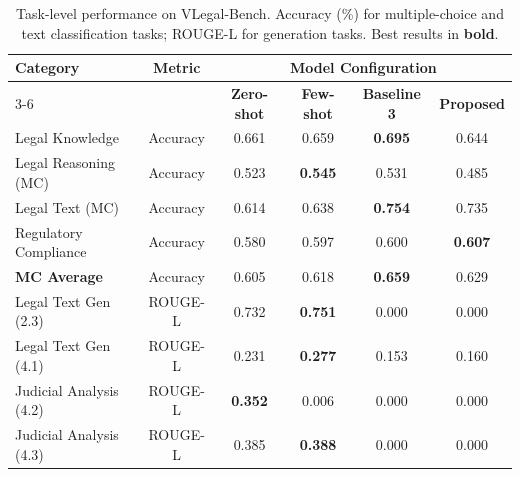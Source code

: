 \documentclass[11pt,a4paper]{article}
\newcommand{\system}{VLegal-Bench}
\newcommand{\rougel}{ROUGE-L}
\begin{document}
\begin{table}[htbp]
\centering
\caption{Task-level performance on \system{}. Accuracy (\%) for multiple-choice and text classification tasks; \rougel{} for generation tasks. Best results in \textbf{bold}.}
\label{tab:main_results}
\begin{tabular}{@{}lccccc@{}}
\toprule
\multirow{2}{*}{\textbf{Category}} & \multirow{2}{*}{\textbf{Metric}} & \multicolumn{4}{c}{\textbf{Model Configuration}} \\
\cmidrule(lr){3-6}
 & & \textbf{Zero-shot} & \textbf{Few-shot} & \textbf{Baseline 3} & \textbf{Proposed} \\
\midrule
Legal Knowledge       & Accuracy & 0.661 & 0.659 & \textbf{0.695} & 0.644 \\
Legal Reasoning (MC)  & Accuracy & 0.523 & \textbf{0.545} & 0.531 & 0.485 \\
Legal Text (MC)       & Accuracy & 0.614 & 0.638 & \textbf{0.754} & 0.735 \\
Regulatory Compliance & Accuracy & 0.580 & 0.597 & 0.600 & \textbf{0.607} \\
\midrule
\textbf{MC Average}   & Accuracy & 0.605 & 0.618 & \textbf{0.659} & 0.629 \\
\midrule
Legal Text Gen (2.3)  & \rougel{} & 0.732 & \textbf{0.751} & 0.000 & 0.000 \\
Legal Text Gen (4.1)  & \rougel{} & 0.231 & \textbf{0.277} & 0.153 & 0.160 \\
Judicial Analysis (4.2) & \rougel{} & \textbf{0.352} & 0.006 & 0.000 & 0.000 \\
Judicial Analysis (4.3) & \rougel{} & 0.385 & \textbf{0.388} & 0.000 & 0.000 \\
\bottomrule
\end{tabular}
\end{table}
\end{document}
